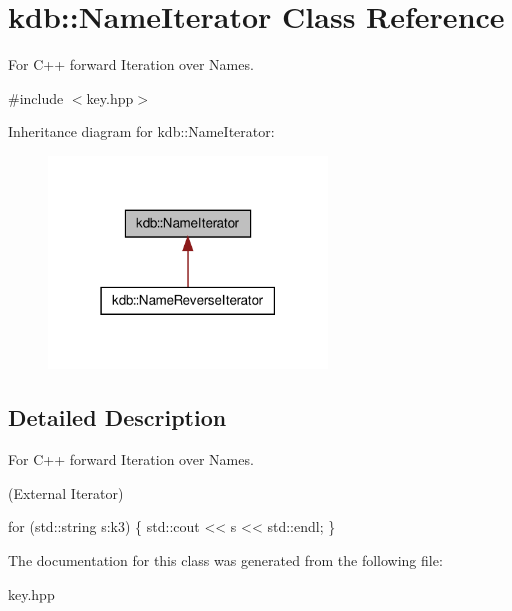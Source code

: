 \hypertarget{classkdb_1_1NameIterator}{\section{kdb\-:\-:Name\-Iterator Class Reference}
\label{classkdb_1_1NameIterator}
}


For C++ forward Iteration over Names.  




{\ttfamily \#include $<$key.\-hpp$>$}



Inheritance diagram for kdb\-:\-:Name\-Iterator\-:
\nopagebreak
\begin{figure}[H]
\begin{center}
\leavevmode
\includegraphics[width=210pt]{classkdb_1_1NameIterator__inherit__graph}
\end{center}
\end{figure}


\subsection{Detailed Description}
For C++ forward Iteration over Names. 

(External Iterator) 
\begin{DoxyCode}
\textcolor{keywordflow}{for} (std::string s:k3)
\{
   std::cout << s << std::endl;
\}
\end{DoxyCode}
 

The documentation for this class was generated from the following file\-:\begin{DoxyCompactItemize}
\item 
key.\-hpp\end{DoxyCompactItemize}
